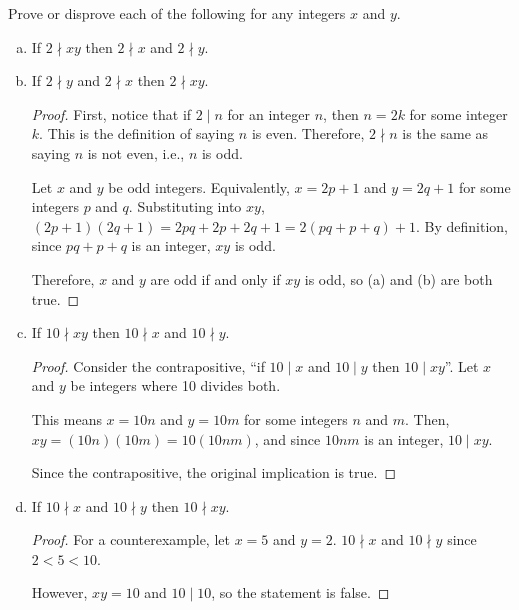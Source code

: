 \question Prove or disprove each of the following for any integers $x$ and $y$.
\begin{enumerate}[(a)]
  \item If $2 \nmid xy$ then $2 \nmid x$ and $2 \nmid y$.
  \item If $2 \nmid y$ and $2 \nmid x$ then $2 \nmid xy$.
        \begin{proof}
          First, notice that if $2 \mid n$ for an integer $n$, then $n = 2k$ for some integer $k$.
          This is the definition of saying $n$ is even.
          Therefore, $2 \nmid n$ is the same as saying $n$ is not even, i.e., $n$ is odd.

          Let $x$ and $y$ be odd integers.
          Equivalently, $x = 2p + 1$ and $y = 2q + 1$ for some integers $p$ and $q$.
          Substituting into $xy$, $(2p + 1)(2q + 1) = 2pq + 2p + 2q + 1 = 2(pq + p + q) + 1$.
          By definition, since $pq + p + q$ is an integer, $xy$ is odd.

          Therefore, $x$ and $y$ are odd if and only if $xy$ is odd, so (a) and (b) are both true.
        \end{proof}
  \item If $10 \nmid xy$ then $10 \nmid x$ and $10 \nmid y$.
        \begin{proof}
          Consider the contrapositive, ``if $10 \mid x$ and $10 \mid y$ then $10 \mid xy$''.
          Let $x$ and $y$ be integers where 10 divides both.

          This means $x = 10n$ and $y = 10m$ for some integers $n$ and $m$.
          Then, $xy = (10n)(10m) = 10(10nm)$, and since $10nm$ is an integer, $10 \mid xy$.

          Since the contrapositive, the original implication is true.
        \end{proof}
  \item If $10 \nmid x$ and $10 \nmid y$ then $10 \nmid xy$.
        \begin{proof}
          For a counterexample, let $x = 5$ and $y = 2$.
          $10 \nmid x$ and $10 \nmid y$ since $2 < 5 < 10$.

          However, $xy = 10$ and $10 \mid 10$, so the statement is false.
        \end{proof}
\end{enumerate}


